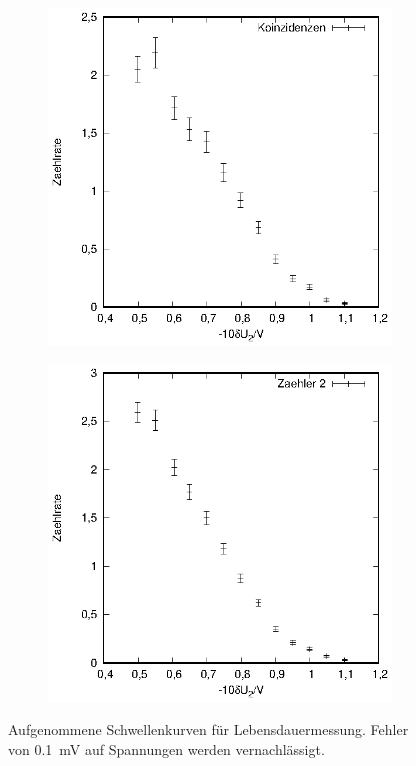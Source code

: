 \begin{figure}[h]
\begin{subfigure}[h]{0.5\textwidth}
  \end{subfigure}
  \begin{subfigure}[h]{0.5\textwidth}
    \centering
    \includegraphics[width=\textwidth]{data/schwelle_2_koinzidenz.eps}
  \end{subfigure}%
  \begin{subfigure}[h]{0.5\textwidth}
    \centering
    \includegraphics[width=\textwidth]{data/schwelle_2_zaehler.eps}
  \end{subfigure}
  \caption{Aufgenommene Schwellenkurven für Lebensdauermessung. Fehler von \SI{0.1}{\milli\volt} auf Spannungen werden vernachlässigt.}
  \label{fig:schwelle_lebensdauer}
\end{figure} 

